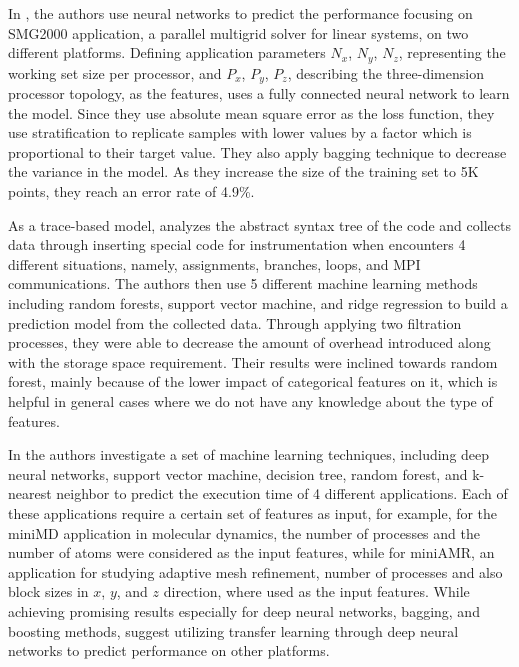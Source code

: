 In \cite{ipek2005approach}, the authors use neural networks to predict the performance focusing on SMG2000 application, a parallel multigrid solver for linear systems\cite{falgout2002hypre}, on two different platforms. Defining application parameters $N_x$, $N_y$, $N_z$, representing the working set size per processor, and $P_x$, $P_y$, $P_z$, describing the three-dimension processor topology, as the features, \cite{ipek2005approach} uses a fully connected neural network to learn the model. Since they use absolute mean square error as the loss function, they use stratification to replicate samples with lower values by a factor which is proportional to their target value. They also apply bagging technique to decrease the variance in the model. As they increase the size of the training set to 5K points, they reach an error rate of 4.9\%. 

As a trace-based model, \cite{sun2017automated} analyzes the abstract syntax tree of the code and collects data through inserting special code for instrumentation when encounters 4 different situations, namely, assignments, branches, loops, and MPI communications. The authors then use 5 different machine learning methods including random forests, support vector machine, and ridge regression to build a prediction model from the collected data. Through applying two filtration processes, they were able to decrease the amount of overhead introduced along with the storage space requirement. Their results were inclined towards random forest, mainly because of the lower impact of categorical features on it, which is helpful in general cases where we do not have any knowledge about the type of features\cite{sun2017automated}.  
	
In \cite{malakar2018benchmarking} the authors investigate a set of machine learning techniques, including deep neural networks, support vector machine, decision tree, random forest, and k-nearest neighbor to predict the execution time of 4 different applications. Each of these applications require a certain set of features as input, for example, for the miniMD application in molecular dynamics, the number of processes and the number of atoms were considered as the input features, while for miniAMR, an application for studying adaptive mesh refinement, number of processes and also block sizes in $x$, $y$, and $z$ direction, where used as the input features. While achieving promising results especially for deep neural networks, bagging, and boosting methods, \cite{malakar2018benchmarking} suggest utilizing transfer learning through deep neural networks to predict performance on other platforms.
	
